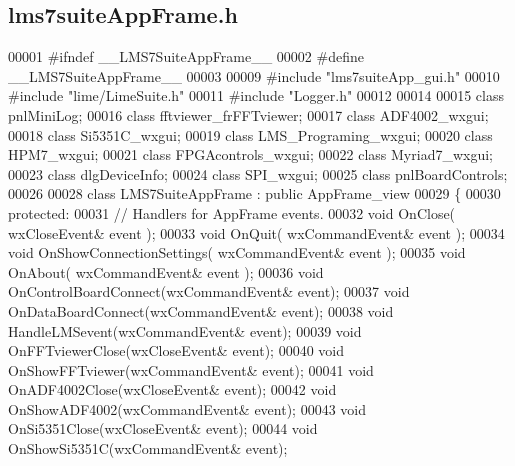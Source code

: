 \subsection{lms7suite\+App\+Frame.\+h}
\label{lms7suiteAppFrame_8h_source}

\begin{DoxyCode}
00001 \textcolor{preprocessor}{#ifndef \_\_LMS7SuiteAppFrame\_\_}
00002 \textcolor{preprocessor}{#define \_\_LMS7SuiteAppFrame\_\_}
00003 
00009 \textcolor{preprocessor}{#include "lms7suiteApp_gui.h"}
00010 \textcolor{preprocessor}{#include "lime/LimeSuite.h"}
00011 \textcolor{preprocessor}{#include "Logger.h"}
00012 
00014 
00015 \textcolor{keyword}{class }pnlMiniLog;
00016 \textcolor{keyword}{class }fftviewer_frFFTviewer;
00017 \textcolor{keyword}{class }ADF4002_wxgui;
00018 \textcolor{keyword}{class }Si5351C_wxgui;
00019 \textcolor{keyword}{class }LMS_Programing_wxgui;
00020 \textcolor{keyword}{class }HPM7_wxgui;
00021 \textcolor{keyword}{class }FPGAcontrols_wxgui;
00022 \textcolor{keyword}{class }Myriad7_wxgui;
00023 \textcolor{keyword}{class }dlgDeviceInfo;
00024 \textcolor{keyword}{class }SPI_wxgui;
00025 \textcolor{keyword}{class }pnlBoardControls;
00026 
00028 \textcolor{keyword}{class }LMS7SuiteAppFrame : \textcolor{keyword}{public} AppFrame_view
00029 \{
00030     \textcolor{keyword}{protected}:
00031         \textcolor{comment}{// Handlers for AppFrame events.}
00032         \textcolor{keywordtype}{void} OnClose( wxCloseEvent& event );
00033         \textcolor{keywordtype}{void} OnQuit( wxCommandEvent& event );
00034         \textcolor{keywordtype}{void} OnShowConnectionSettings( wxCommandEvent& event );
00035         \textcolor{keywordtype}{void} OnAbout( wxCommandEvent& event );
00036         \textcolor{keywordtype}{void} OnControlBoardConnect(wxCommandEvent& event);
00037         \textcolor{keywordtype}{void} OnDataBoardConnect(wxCommandEvent& event);
00038         \textcolor{keywordtype}{void} HandleLMSevent(wxCommandEvent& event);
00039         \textcolor{keywordtype}{void} OnFFTviewerClose(wxCloseEvent& event);
00040         \textcolor{keywordtype}{void} OnShowFFTviewer(wxCommandEvent& event);
00041         \textcolor{keywordtype}{void} OnADF4002Close(wxCloseEvent& event);
00042         \textcolor{keywordtype}{void} OnShowADF4002(wxCommandEvent& event);
00043         \textcolor{keywordtype}{void} OnSi5351Close(wxCloseEvent& event);
00044         \textcolor{keywordtype}{void} OnShowSi5351C(wxCommandEvent& event);

\end{DoxyCode}
